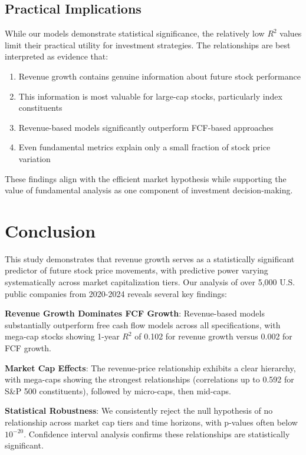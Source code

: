 \documentclass[11pt]{article}
\begin{document}
\subsection{Practical Implications}

While our models demonstrate statistical significance, the relatively low $R^2$ values limit their practical utility for investment strategies. The relationships are best interpreted as evidence that:

\begin{enumerate}
\item Revenue growth contains genuine information about future stock performance
\item This information is most valuable for large-cap stocks, particularly index constituents  
\item Revenue-based models significantly outperform FCF-based approaches
\item Even fundamental metrics explain only a small fraction of stock price variation
\end{enumerate}

These findings align with the efficient market hypothesis while supporting the value of fundamental analysis as one component of investment decision-making.

\section{Conclusion}

This study demonstrates that revenue growth serves as a statistically significant predictor of future stock price movements, with predictive power varying systematically across market capitalization tiers. Our analysis of over 5,000 U.S. public companies from 2020-2024 reveals several key findings:

\textbf{Revenue Growth Dominates FCF Growth}: Revenue-based models substantially outperform free cash flow models across all specifications, with mega-cap stocks showing 1-year $R^2$ of 0.102 for revenue growth versus 0.002 for FCF growth.

\textbf{Market Cap Effects}: The revenue-price relationship exhibits a clear hierarchy, with mega-caps showing the strongest relationships (correlations up to 0.592 for S\&P 500 constituents), followed by micro-caps, then mid-caps.

\textbf{Statistical Robustness}: We consistently reject the null hypothesis of no relationship across market cap tiers and time horizons, with p-values often below $10^{-20}$. Confidence interval analysis confirms these relationships are statistically significant.
\end{document}
